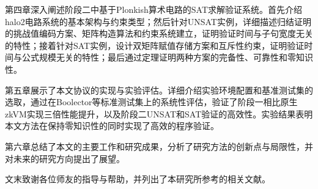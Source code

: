 第四章深入阐述阶段二中基于Plonkish算术电路的SAT求解验证系统。首先介绍halo2电路系统的基本架构与约束类型；然后针对UNSAT实例，详细描述归结证明的挑战值编码方案、矩阵构造算法和约束系统建立，证明验证时间与子句宽度无关的特性；接着针对SAT实例，设计双矩阵赋值存储方案和互斥性约束，证明验证时间与公式规模无关的特性；最后通过定理证明两种方案的完备性、可靠性和零知识性。

第五章展示了本文协议的实现与实验评估。详细介绍实验环境配置和基准测试集的选取，通过在Boolector等标准测试集上的系统性评估，验证了阶段一相比原生zkVM实现三倍性能提升，以及阶段二UNSAT和SAT验证的高效性。实验结果表明本文方法在保持零知识性的同时实现了高效的程序验证。

第六章总结了本文的主要工作和研究成果，分析了研究方法的创新点与局限性，并对未来的研究方向提出了展望。

文末致谢各位师友的指导与帮助，并列出了本研究所参考的相关文献。